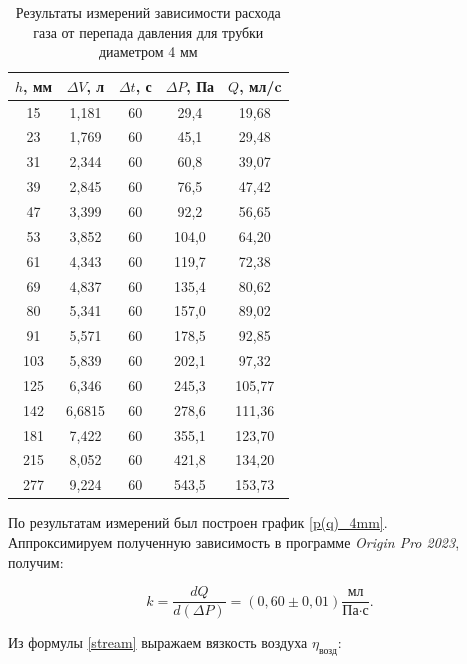 \documentclass[a4paper, 12pt]{article}
\begin{document}
    \begin{table}[H]
        \centering
        \begin{tabular}{|c|c|c|c|c|}
        \hline
        $h$, мм & $\Delta V$, л & $\Delta t$, с & $\Delta P$, Па & $Q$, мл/c \\ \hline
        15 & 1,181 & 60 & 29,4 & 19,68 \\ \hline
        23 & 1,769 & 60 & 45,1 & 29,48 \\ \hline
        31 & 2,344 & 60 & 60,8 & 39,07 \\ \hline
        39 & 2,845 & 60 & 76,5 & 47,42 \\ \hline
        47 & 3,399 & 60 & 92,2 & 56,65 \\ \hline
        53 & 3,852 & 60 & 104,0 & 64,20 \\ \hline
        61 & 4,343 & 60 & 119,7 & 72,38 \\ \hline
        69 & 4,837 & 60 & 135,4 & 80,62 \\ \hline
        80 & 5,341 & 60 & 157,0 & 89,02 \\ \hline
        91 & 5,571 & 60 & 178,5 & 92,85 \\ \hline
        103 & 5,839 & 60 & 202,1 & 97,32 \\ \hline
        125 & 6,346 & 60 & 245,3 & 105,77 \\ \hline
        142 & 6,6815 & 60 & 278,6 & 111,36 \\ \hline
        181 & 7,422 & 60 & 355,1 & 123,70 \\ \hline
        215 & 8,052 & 60 & 421,8 & 134,20 \\ \hline
        277 & 9,224 & 60 & 543,5 & 153,73 \\ \hline
        \end{tabular}
        \caption{Результаты измерений зависимости расхода газа от перепада давления для трубки диаметром 4 мм}
        \label{tab:q(p)_4mm}
    \end{table}

    \noindent По результатам измерений был построен график \ref{p(q)_4mm}. \\

    \noindent Аппроксимируем полученную зависимость в программе \textit{Origin Pro 2023}, получим:
    
    \[ k = \frac{dQ}{d(\Delta P)} = \left(0,60 \pm 0,01\right) \frac{\text{мл}}{\text{Па} \cdot \text{с}}.\]

    \noindent Из формулы \eqref{stream} выражаем вязкость воздуха $\eta_\text{возд}$:
\end{document}

